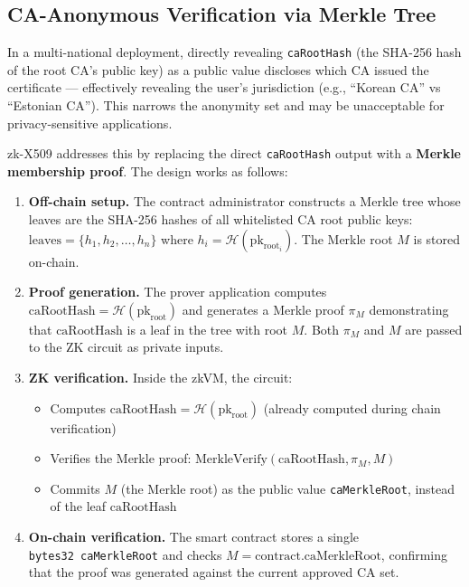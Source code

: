 \documentclass[11pt, a4paper]{article}
\providecommand{\tightlist}{%
  \setlength{\itemsep}{0pt}\setlength{\parskip}{0pt}}
\begin{document}
\subsection{CA-Anonymous Verification via Merkle
Tree}\label{ca-anonymous-verification-via-merkle-tree}

In a multi-national deployment, directly revealing \texttt{caRootHash}
(the SHA-256 hash of the root CA's public key) as a public value
discloses which CA issued the certificate --- effectively revealing the
user's jurisdiction (e.g., ``Korean CA'' vs ``Estonian CA''). This
narrows the anonymity set and may be unacceptable for privacy-sensitive
applications.

zk-X509 addresses this by replacing the direct \texttt{caRootHash}
output with a \textbf{Merkle membership proof}. The design works as
follows:

\begin{enumerate}
\def\labelenumi{\arabic{enumi}.}
\item
  \textbf{Off-chain setup.} The contract administrator constructs a
  Merkle tree whose leaves are the SHA-256 hashes of all whitelisted CA
  root public keys: \(\text{leaves} = \{h_1, h_2, \ldots, h_n\}\) where
  \(h_i = \mathcal{H}(\text{pk}_{\text{root}_i})\). The Merkle root
  \(M\) is stored on-chain.
\item
  \textbf{Proof generation.} The prover application computes
  \(\text{caRootHash} = \mathcal{H}(\text{pk}_{\text{root}})\) and
  generates a Merkle proof \(\pi_M\) demonstrating that
  \(\text{caRootHash}\) is a leaf in the tree with root \(M\). Both
  \(\pi_M\) and \(M\) are passed to the ZK circuit as private inputs.
\item
  \textbf{ZK verification.} Inside the zkVM, the circuit:

  \begin{itemize}
  \tightlist
  \item
    Computes
    \(\text{caRootHash} = \mathcal{H}(\text{pk}_{\text{root}})\)
    (already computed during chain verification)
  \item
    Verifies the Merkle proof:
    \(\text{MerkleVerify}(\text{caRootHash}, \pi_M, M)\)
  \item
    Commits \(M\) (the Merkle root) as the public value
    \texttt{caMerkleRoot}, instead of the leaf \(\text{caRootHash}\)
  \end{itemize}
\item
  \textbf{On-chain verification.} The smart contract stores a single
  \texttt{bytes32\ caMerkleRoot} and checks
  \(M = \text{contract.caMerkleRoot}\), confirming that the proof was
  generated against the current approved CA set.
\end{enumerate}
\end{document}
